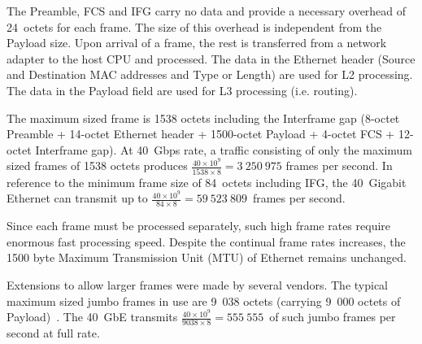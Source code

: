 The Preamble, FCS and IFG carry no data and provide a necessary overhead of 24~octets for each frame.
The size of this overhead is independent from the Payload size.
Upon arrival of a frame, the rest is transferred from a network adapter to the host CPU and processed.
The data in the Ethernet header (Source and Destination MAC addresses and Type or Length) are used for L2 processing.
The data in the Payload field are used for L3 processing (i.e. routing).

The maximum sized frame is 1538 octets including the Interframe gap
(8-octet Preamble + 14-octet Ethernet header + 1500-octet Payload + 4-octet FCS + 12-octet Interframe gap).
At 40~Gbps rate, a traffic consisting of only the maximum sized frames of 1538 octets
produces $\frac{40 \times 10^{9}}{1538 \times 8} = 3~250~975$ frames per second.
In reference to the minimum frame size of 84~octets including IFG,
the 40~Gigabit Ethernet can transmit up to $\frac{40 \times 10^{9}}{84 \times 8} = 59~523~809$~frames per second.

Since each frame must be processed separately,
such high frame rates require enormous fast processing speed.
Despite the continual frame rates increases,
the 1500 byte Maximum Transmission Unit (MTU) of Ethernet remains unchanged.

Extensions to allow larger frames were made by several vendors.
The typical maximum sized jumbo frames in use are 9~038 octets (carrying 9~000 octets of Payload)~\cite{ea-jumbo-frames}.
The 40~GbE transmits $\frac{40 \times 10^{9}}{9038 \times 8} = 555~555$~of such jumbo frames per second at full rate.
